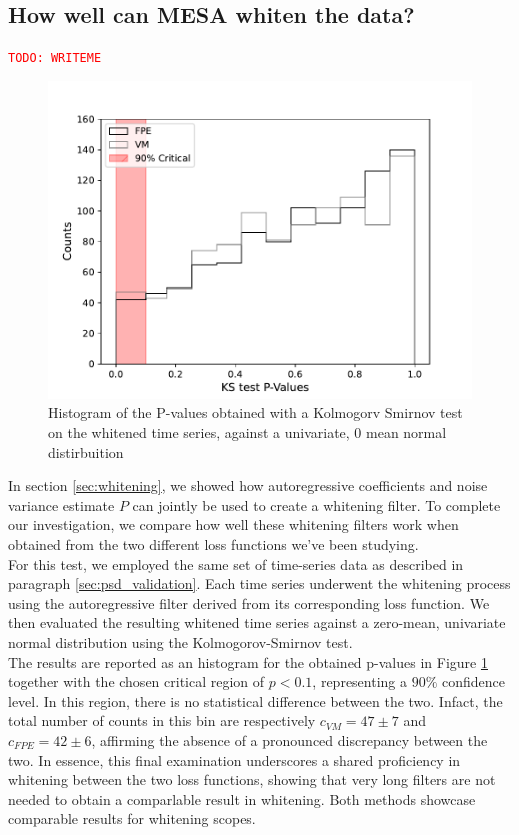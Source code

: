 \documentclass{aa}
\newcommand{\todo}[1]{{\textcolor{red}{\texttt{TODO: #1}} }}
\begin{document}
\subsection{How well can MESA whiten the data?}\label{sec:whitening_validation}
\todo{WRITEME}
\begin{figure}
	\includegraphics[width = \linewidth]{Images/Plots/P_values_comparison}
	\caption{Histogram of the P-values obtained with a Kolmogorv Smirnov test on the whitened time series, against a univariate, 0 mean normal distirbuition}
	\label{fig:whitening}
\end{figure}
In section \ref{sec:whitening}, we showed how autoregressive coefficients and noise variance estimate $P$ can jointly be used to create a whitening filter. To complete our investigation, we compare how well these whitening filters work when obtained from the two different loss functions we've been studying. \\ 
For this test, we employed the same set of time-series data as described in paragraph \ref{sec:psd_validation}. Each time series underwent the whitening process using the autoregressive filter derived from its corresponding loss function. We then evaluated the resulting whitened time series against a zero-mean, univariate normal distribution using the Kolmogorov-Smirnov test. \\
The results are reported as an histogram for the obtained p-values in Figure \ref{fig:whitening} together with the chosen critical region of $p < 0.1$, representing a $90\%$  confidence level. In this region, there is no statistical difference between the two. Infact, the total number of counts in this bin are respectively $c_{VM} = 47 \pm 7$ and $c_{FPE} = 42 \pm 6$, affirming the absence of a pronounced discrepancy between the two.
In essence, this final examination underscores a shared proficiency in whitening between the two loss functions, showing that very long filters are not needed to obtain a comparlable result in whitening. Both methods showcase comparable results for whitening scopes.\\
\end{document}
